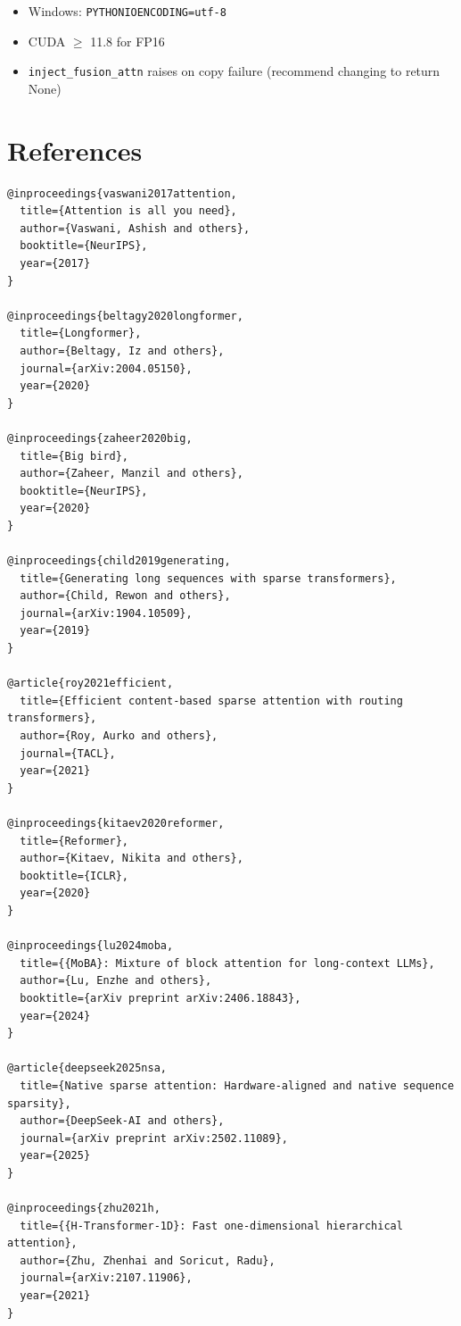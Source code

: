 \begin{itemize}
\item Windows: \texttt{PYTHONIOENCODING=utf-8}
\item CUDA $\ge$ 11.8 for FP16
\item \texttt{inject\_fusion\_attn} raises on copy failure (recommend changing to return None)

\end{itemize}


\section{References}

\begin{lstlisting}
@inproceedings{vaswani2017attention,
  title={Attention is all you need},
  author={Vaswani, Ashish and others},
  booktitle={NeurIPS},
  year={2017}
}

@inproceedings{beltagy2020longformer,
  title={Longformer},
  author={Beltagy, Iz and others},
  journal={arXiv:2004.05150},
  year={2020}
}

@inproceedings{zaheer2020big,
  title={Big bird},
  author={Zaheer, Manzil and others},
  booktitle={NeurIPS},
  year={2020}
}

@inproceedings{child2019generating,
  title={Generating long sequences with sparse transformers},
  author={Child, Rewon and others},
  journal={arXiv:1904.10509},
  year={2019}
}

@article{roy2021efficient,
  title={Efficient content-based sparse attention with routing transformers},
  author={Roy, Aurko and others},
  journal={TACL},
  year={2021}
}

@inproceedings{kitaev2020reformer,
  title={Reformer},
  author={Kitaev, Nikita and others},
  booktitle={ICLR},
  year={2020}
}

@inproceedings{lu2024moba,
  title={{MoBA}: Mixture of block attention for long-context LLMs},
  author={Lu, Enzhe and others},
  booktitle={arXiv preprint arXiv:2406.18843},
  year={2024}
}

@article{deepseek2025nsa,
  title={Native sparse attention: Hardware-aligned and native sequence sparsity},
  author={DeepSeek-AI and others},
  journal={arXiv preprint arXiv:2502.11089},
  year={2025}
}

@inproceedings{zhu2021h,
  title={{H-Transformer-1D}: Fast one-dimensional hierarchical attention},
  author={Zhu, Zhenhai and Soricut, Radu},
  journal={arXiv:2107.11906},
  year={2021}
}


\end{lstlisting}
